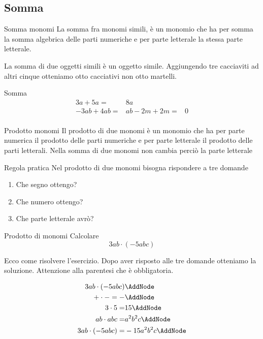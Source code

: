 \subsection{Somma}
\begin{definizionet}{Somma monomi}{}
La somma fra monomi simili, è un monomio che ha per somma la somma algebrica delle parti numeriche e per parte letterale la stessa parte letterale.  
\end{definizionet}
La somma di due oggetti simili è un oggetto simile. Aggiungendo tre cacciaviti ad altri cinque  otteniamo otto cacciativi non otto martelli.
\begin{esempiot}{Somma}{}
	\begin{align*}
		3a+5a=&8a\\
		-3ab+4ab=&ab
		-2m+2m=&0\\
	\end{align*}
\end{esempiot}
\begin{definizionet}{Prodotto monomi}
	Il prodotto di due monomi è un monomio che ha per parte numerica il prodotto delle parti numeriche e per parte letterale il prodotto delle parti letterali. Nella somma di due monomi non cambia perciò la parte letterale
\end{definizionet}
\begin{osservazionet}{Regola pratica}{}
Nel prodotto di due monomi bisogna rispondere a tre domande
\begin{enumerate}
	\item Che segno ottengo?
	\item Che numero ottengo?
	\item Che parte letterale avrò?
\end{enumerate}
\end{osservazionet}
\begin{esempiot}{Prodotto di monomi}{}
	Calcolare \[3ab\cdot(-5abc)\]
\end{esempiot}
Ecco come risolvere l'esercizio. Dopo aver risposto alle tre domande otteniamo la soluzione. Attenzione alla parentesi che è obbligatoria.
\begin{NodesList}[dy=3pt]
	\begin{align*}
		3ab\cdot(-5abc)&\AddNode\\ %
		+\cdot -=-&\AddNode\\
		3\cdot 5=&15\AddNode\\
		ab\cdot abc=&a^2b^2c\AddNode\\
		3ab\cdot(-5abc)=&-15a^2b^2c\AddNode
	\end{align*}
\end{NodesList}
